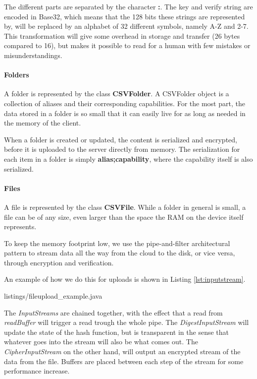 \documentclass[pdftex,english,10pt,b5paper,twoside]{book}
\begin{document}
The different parts are separated by the character \textbf{:}. The key and
verify string are encoded in Base32, which means that the 128 bits these
strings are represented by, will be replaced by an alphabet of 32 different
symbols, namely A-Z and 2-7. This transformation will give some overhead in
storage and transfer (26 bytes compared to 16), but makes it possible to read for a human
with few mistakes or misunderstandings.

\paragraph{Folders}

A folder is represented by the class \textbf{CSVFolder}. A CSVFolder object is
a collection of aliases and their corresponding capabilities. For
the most part, the data stored in a folder is so small that it can easily live for
as long as needed in the memory of the client.

When a folder is created or updated, the content is serialized and encrypted,
before it is uploaded to the server directly from memory. The serialization for
each item in a folder is simply \textbf{alias;capability}, where the capability
itself is also serialized.

\paragraph{Files}

A file is represented by the class \textbf{CSVFile}. While a folder in general is small,
a file can be of any size, even larger than the space the \ac{RAM} on the
device itself represents.

To keep the memory footprint low, we use the pipe-and-filter architectural
pattern to stream data all the way from the cloud to the disk, or vice versa,
through encryption and verification.

An example of how we do this for uploads is shown in Listing
\ref{lst:inputstream}.


{listings/fileupload_example.java}

The \emph{InputStreams} are chained together, with the effect that a read from
\emph{readBuffer} will trigger a read trough the whole pipe. The
\emph{DigestInputStream} will update the state of the hash function, but is
transparent in the sense that whatever goes into the stream will also be what
comes out. The \emph{CipherInputStream} on the other hand, will output an encrypted
stream of the data from the file. Buffers are placed between each step of the
stream for some performance increase.
\end{document}

